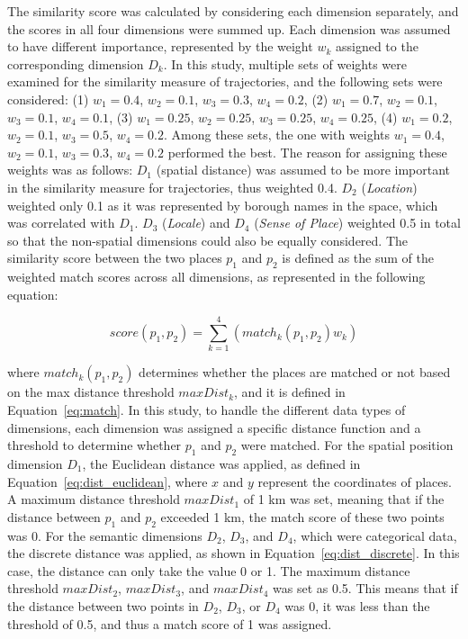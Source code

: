 \documentclass{article}
\theoremstyle{remark}
\begin{document}
The similarity score was calculated by considering each dimension separately, and the scores in all four dimensions were summed up. Each dimension was assumed to have different importance, represented by the weight $w_{k}$ assigned to the corresponding dimension $D_{k}$. In this study, multiple sets of weights were examined for the similarity measure of trajectories, and the following sets were considered: (1) $w_{1}=0.4$, $w_{2}=0.1$, $w_{3}=0.3$, $w_{4}=0.2$, (2) $w_{1}=0.7$, $w_{2}=0.1$, $w_{3}=0.1$, $w_{4}=0.1$, (3) $w_{1}=0.25$, $w_{2}=0.25$, $w_{3}=0.25$, $w_{4}=0.25$, (4) $w_{1}=0.2$, $w_{2}=0.1$, $w_{3}=0.5$, $w_{4}=0.2$. Among these sets, the one with weights $w_{1}=0.4$, $w_{2}=0.1$, $w_{3}=0.3$, $w_{4}=0.2$ performed the best. The reason for assigning these weights was as follows: $D_{1}$ (spatial distance) was assumed to be more important in the similarity measure for trajectories, thus weighted 0.4. $D_{2}$ (\textit{Location}) weighted only 0.1 as it was represented by borough names in the space, which was correlated with $D_{1}$. $D_{3}$ (\textit{Locale}) and $D_{4}$ (\textit{Sense of Place}) weighted 0.5 in total so that the non-spatial dimensions could also be equally considered. The similarity score between the two places $p_{1}$ and $p_{2}$ is defined as the sum of the weighted match scores across all dimensions, as represented in the following equation:

\begin{equation} \label{eq:match_score}
    score(p_{1},p_{2}) = \sum_{k=1}^{4}(match_{k}(p_{1},p_{2})w_{k})
\end{equation}

where $match_{k}(p_{1},p_{2})$ determines whether the places are matched or not based on the max distance threshold $maxDist_{k}$, and it is defined in Equation~\ref{eq:match}. In this study, to handle the different data types of dimensions, each dimension was assigned a specific distance function and a threshold to determine whether $p_{1}$ and $p_{2}$ were matched. For the spatial position dimension $D_{1}$, the Euclidean distance was applied, as defined in Equation~\ref{eq:dist_euclidean}, where $x$ and $y$ represent the coordinates of places. A maximum distance threshold $maxDist_{1}$ of 1 km was set, meaning that if the distance between $p_{1}$ and $p_{2}$ exceeded 1 km, the match score of these two points was 0. For the semantic dimensions $D_{2}$, $D_{3}$, and $D_{4}$, which were categorical data, the discrete distance was applied, as shown in Equation~\ref{eq:dist_discrete}. In this case, the distance can only take the value 0 or 1. The maximum distance threshold $maxDist_{2}$, $maxDist_{3}$, and $maxDist_{4}$ was set as 0.5. This means that if the distance between two points in $D_{2}$, $D_{3}$, or $D_{4}$ was 0, it was less than the threshold of 0.5, and thus a match score of 1 was assigned.
\end{document}
